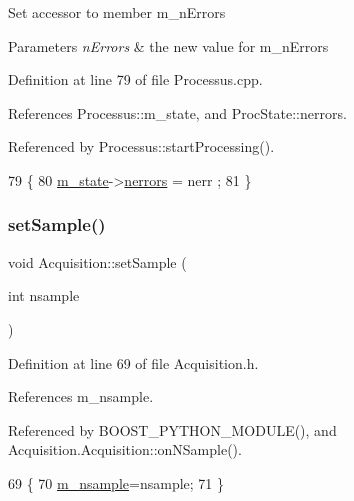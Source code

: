 Set accessor to member m\+\_\+n\+Errors 
\begin{DoxyParams}{Parameters}
{\em n\+Errors} & the new value for m\+\_\+n\+Errors \\
\hline
\end{DoxyParams}


Definition at line 79 of file Processus.\+cpp.



References Processus\+::m\+\_\+state, and Proc\+State\+::nerrors.



Referenced by Processus\+::start\+Processing().


\begin{DoxyCode}
79                                              \{
80   \hyperlink{classProcessus_ab3539eee42891ceae0baf4395ae7fb61}{m\_state}->\hyperlink{structProcState_a51a0f54ba62b07e07ac8518c5f32828d}{nerrors} = nerr ;
81 \}
\end{DoxyCode}
\mbox{\label{classAcquisition_ade6fd6483b3e3737fe7dcdffb5065954}} 
\subsubsection{\texorpdfstring{set\+Sample()}{setSample()}}
{\footnotesize\ttfamily void Acquisition\+::set\+Sample (\begin{DoxyParamCaption}\item[{int}]{nsample }\end{DoxyParamCaption})\hspace{0.3cm}{\ttfamily [inline]}}



Definition at line 69 of file Acquisition.\+h.



References m\+\_\+nsample.



Referenced by B\+O\+O\+S\+T\+\_\+\+P\+Y\+T\+H\+O\+N\+\_\+\+M\+O\+D\+U\+L\+E(), and Acquisition.\+Acquisition\+::on\+N\+Sample().


\begin{DoxyCode}
69                              \{
70     \hyperlink{classAcquisition_a26d0f1a44309ffac49c365b7ee568ab2}{m\_nsample}=nsample;
71   \}
\end{DoxyCode}
\mbox{\label{classProcessus_ad38cde0f1bcefa00b068e7947b8af927}} 
